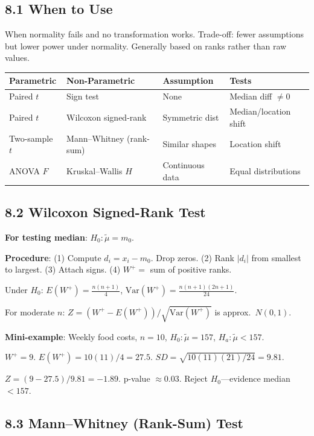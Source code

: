 \documentclass[9pt,letterpaper]{article}
\begin{document}
\subsection{8.1 When to Use}
When normality fails and no transformation works. Trade-off: fewer assumptions but lower power under normality. Generally based on ranks rather than raw values.

\begin{center}\small
\begin{tabular}{@{}llll@{}}
\toprule
Parametric & Non-Parametric & Assumption & Tests \\
\midrule
Paired $t$ & Sign test & None & Median diff $\ne 0$ \\
Paired $t$ & Wilcoxon signed-rank & Symmetric dist & Median/location shift \\
Two-sample $t$ & Mann--Whitney (rank-sum) & Similar shapes & Location shift \\
ANOVA $F$ & Kruskal--Wallis $H$ & Continuous data & Equal distributions \\
\bottomrule
\end{tabular}
\end{center}

\subsection{8.2 Wilcoxon Signed-Rank Test}

\textbf{For testing median}: $H_0: \tilde\mu = m_0$.

\textbf{Procedure}: (1) Compute $d_i = x_i - m_0$. Drop zeros. (2) Rank $|d_i|$ from smallest to largest. (3) Attach signs. (4) $W^+ = $ sum of positive ranks.

Under $H_0$: $E(W^+) = \frac{n(n+1)}{4}$, \quad $\text{Var}(W^+) = \frac{n(n+1)(2n+1)}{24}$.

For moderate $n$: $Z = (W^+ - E(W^+))/\sqrt{\text{Var}(W^+)}$ is approx.\ $N(0,1)$.

\textbf{Mini-example}: Weekly food costs, $n=10$, $H_0:\tilde\mu=157$, $H_a:\tilde\mu<157$.

$W^+ = 9$. $E(W^+) = 10(11)/4 = 27.5$. $SD = \sqrt{10(11)(21)/24} = 9.81$.

$Z = (9-27.5)/9.81 = -1.89$. p-value $\approx 0.03$. Reject $H_0$---evidence median $< 157$.

\subsection{8.3 Mann--Whitney (Rank-Sum) Test}
\end{document}
